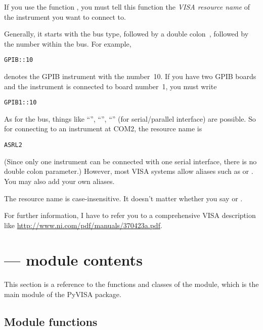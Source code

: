 \documentclass{howto}
\begin{document}
If you use the function , you must tell this function
the \emph{VISA resource name} of the instrument you want to connect to.

Generally, it starts with the bus type, followed by a double colon~\samp{::},
followed by the number within the bus.  For example,
\begin{verbatim}
GPIB::10
\end{verbatim}
denotes the GPIB instrument with the number~10.  If you have two GPIB boards
and the instrument is connected to board number~1, you must write
\begin{verbatim}
GPIB1::10
\end{verbatim}

As for the bus, things like ``'', ``'', ``''
(for serial/parallel interface) are possible.  So for connecting to an
instrument at COM2, the resource name is
\begin{verbatim}
ASRL2
\end{verbatim}
(Since only one instrument can be connected with one serial interface, there is
no double colon parameter.)  However, most VISA systems allow aliases such as
 or .  You may also add your own aliases.

The resource name is case-insensitive.  It doesn't matter whether you say
 or .

\begin{raggedright}
For further information, I have to refer you to a comprehensive VISA
description like \url{http://www.ni.com/pdf/manuals/370423a.pdf}.

\end{raggedright}


\section{ --- module contents}


This section is a reference to the functions and classes of the 
module, which is the main module of the PyVISA package.


\subsection{Module functions}
\end{document}
